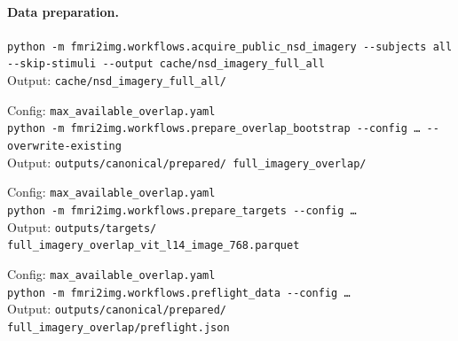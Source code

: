 \documentclass{article}
\begin{document}
\paragraph{Data preparation.}
\begin{description}[style=nextline,font=\normalfont\itshape,
                    leftmargin=0.5em,itemsep=6pt]
\item[Acquisition.]
  \texttt{python -m fmri2img.workflows.acquire\_public\_nsd\_imagery
  -{}-subjects all -{}-skip-stimuli
  -{}-output cache/nsd\_imagery\_full\_all}\\
  Output: \texttt{cache/nsd\_imagery\_full\_all/}

\item[Overlap assembly.]
  Config: \texttt{max\_available\_overlap.yaml}\\
  \texttt{python -m fmri2img.workflows.prepare\_overlap\_bootstrap
  -{}-config \ldots{} -{}-overwrite-existing}\\
  Output: \texttt{outputs/canonical/prepared/\allowbreak
  full\_imagery\_overlap/}

\item[Target cache.]
  Config: \texttt{max\_available\_overlap.yaml}\\
  \texttt{python -m fmri2img.workflows.prepare\_targets -{}-config \ldots}\\
  Output: \texttt{outputs/targets/\allowbreak
  full\_imagery\_overlap\_vit\_l14\_image\_768.parquet}

\item[Preflight.]
  Config: \texttt{max\_available\_overlap.yaml}\\
  \texttt{python -m fmri2img.workflows.preflight\_data -{}-config \ldots}\\
  Output: \texttt{outputs/canonical/prepared/\allowbreak
  full\_imagery\_overlap/\allowbreak preflight.json}
\end{description}
\end{document}
